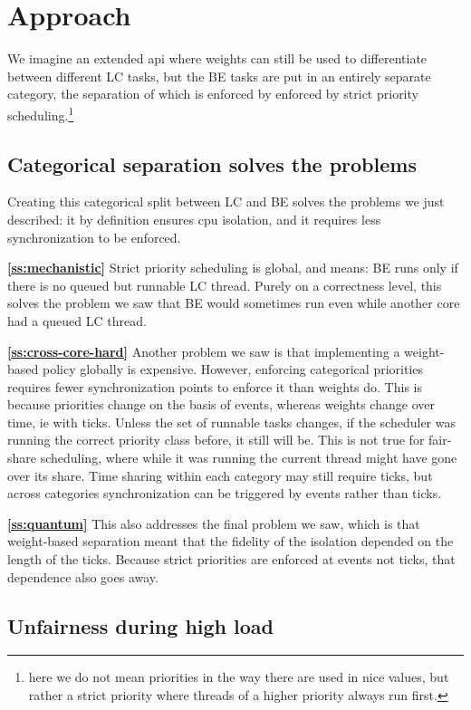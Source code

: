 \section{Approach}\label{s:approach}

We imagine an extended \cgroups{} api where weights can still be used to
differentiate between different LC tasks, but the BE tasks are put in an
entirely separate category, the separation of which is enforced by enforced by
strict priority scheduling.\footnote{here we do not mean priorities in the way
there are used in nice values, but rather a strict priority where threads of a
higher priority always run first.}

\subsection{Categorical separation solves the problems}

Creating this categorical split between LC and BE  solves the problems we just
described: it by definition ensures cpu isolation, and it requires less
synchronization to be enforced.

\textbf{\autoref{ss:mechanistic}} Strict priority scheduling is global, and
means: BE runs only if there is no queued but runnable LC thread. Purely on a
correctness level, this solves the problem we saw that BE would sometimes run
even while another core had a queued LC thread.

\textbf{\autoref{ss:cross-core-hard}} Another problem we saw is that
implementing a weight-based policy globally is expensive. However, enforcing
categorical priorities requires fewer synchronization points to enforce it than
weights do. This is because priorities change on the basis of events, whereas
weights change over time, ie with ticks. Unless the set of runnable tasks
changes, if the scheduler was running the correct priority class before, it
still will be. This is not true for fair-share scheduling, where while it was
running the current thread might have gone over its share. Time sharing within
each category may still require ticks, but across categories synchronization can
be triggered by events rather than ticks.

\textbf{\autoref{ss:quantum}} This also addresses the final problem we saw,
which is that weight-based separation meant that the fidelity of the isolation
depended on the length of the ticks. Because strict priorities are enforced at
events not ticks, that dependence also goes away.

\subsection{Unfairness during high load}

